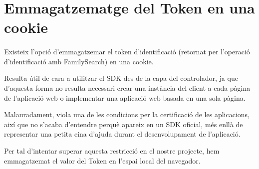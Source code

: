 \section{Emmagatzematge del Token en una cookie}

    \paragraph{}
    Existeix l'opció d'emmagatzemar el token d'identificació (retornat per l’operació d'identificació amb FamilySearch) en una cookie.

    Resulta útil de cara a utilitzar el SDK des de la capa del controlador, ja que d’aquesta forma no resulta necessari crear una instància del client a cada pàgina de l’aplicació web o implementar una aplicació web basada en una sola pàgina.

    Malauradament, viola una de les condicions per la certificació de les aplicacions, així que no s'acaba d'entendre perquè apareix en un SDK oficial, més enllà de re\-pre\-sen\-tar una petita eina d'ajuda durant el desenvolupament de l'aplicació.

    Per tal d'intentar superar aquesta restricció en el nostre projecte, hem emmagatzemat el valor del Token en l’espai local del navegador.
